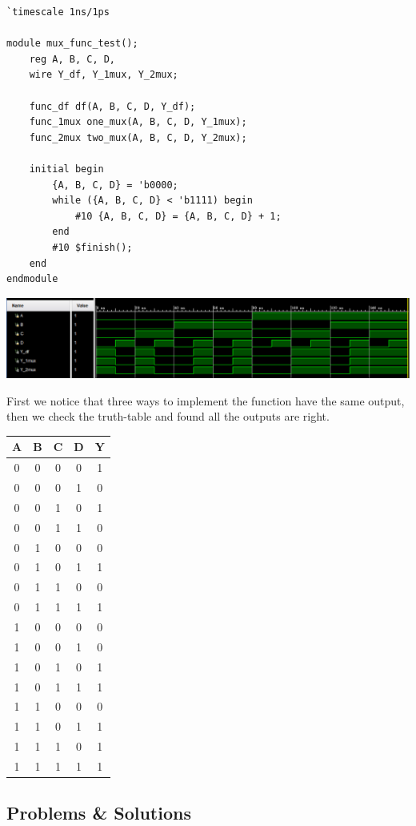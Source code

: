 \documentclass[onecolumn, oneside, ctexart]{SUSTechHomework}
\begin{document}
\begin{lstlisting}
`timescale 1ns/1ps

module mux_func_test();
    reg A, B, C, D,
    wire Y_df, Y_1mux, Y_2mux;

    func_df df(A, B, C, D, Y_df);
    func_1mux one_mux(A, B, C, D, Y_1mux);
    func_2mux two_mux(A, B, C, D, Y_2mux);

    initial begin
        {A, B, C, D} = 'b0000;
        while ({A, B, C, D} < 'b1111) begin
            #10 {A, B, C, D} = {A, B, C, D} + 1;
        end
        #10 $finish();
    end
endmodule
\end{lstlisting}
\vspace{-2em}
\centerline{\includegraphics[width=\textwidth]{fig/func}}
\par First we notice that three ways to implement the function have the same output, then we check the truth-table and found all the outputs are right.
\begin{longtable}{cccc|c}
\hline
A & B & C & D & Y \\ \hline
\endfirsthead
%
\endhead
%
\hline
\endfoot
%
\endlastfoot
%
0 & 0 & 0 & 0 & 1 \\
0 & 0 & 0 & 1 & 0 \\
0 & 0 & 1 & 0 & 1 \\
0 & 0 & 1 & 1 & 0 \\
0 & 1 & 0 & 0 & 0 \\
0 & 1 & 0 & 1 & 1 \\
0 & 1 & 1 & 0 & 0 \\
0 & 1 & 1 & 1 & 1 \\
1 & 0 & 0 & 0 & 0 \\
1 & 0 & 0 & 1 & 0 \\
1 & 0 & 1 & 0 & 1 \\
1 & 0 & 1 & 1 & 1 \\
1 & 1 & 0 & 0 & 0 \\
1 & 1 & 0 & 1 & 1 \\
1 & 1 & 1 & 0 & 1 \\
1 & 1 & 1 & 1 & 1 \\ \hline
\end{longtable}


\subsection*{Problems \& Solutions}
\end{document}
